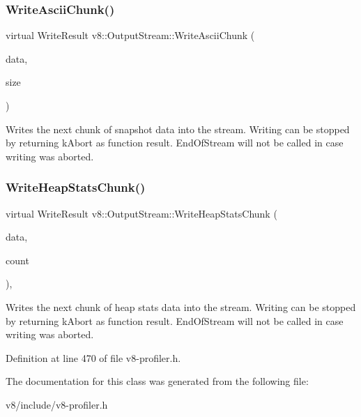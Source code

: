\subsubsection{\texorpdfstring{Write\+Ascii\+Chunk()}{WriteAsciiChunk()}}
{\footnotesize\ttfamily virtual Write\+Result v8\+::\+Output\+Stream\+::\+Write\+Ascii\+Chunk (\begin{DoxyParamCaption}\item[{\mbox{\hyperlink{classchar}{char}} $\ast$}]{data,  }\item[{\mbox{\hyperlink{classint}{int}}}]{size }\end{DoxyParamCaption})\hspace{0.3cm}{\ttfamily [pure virtual]}}

Writes the next chunk of snapshot data into the stream. Writing can be stopped by returning k\+Abort as function result. End\+Of\+Stream will not be called in case writing was aborted. \mbox{\label{classv8_1_1OutputStream_a104fd1a0b5ef685e1d4967aaacbb9e9d}} 
\subsubsection{\texorpdfstring{Write\+Heap\+Stats\+Chunk()}{WriteHeapStatsChunk()}}
{\footnotesize\ttfamily virtual Write\+Result v8\+::\+Output\+Stream\+::\+Write\+Heap\+Stats\+Chunk (\begin{DoxyParamCaption}\item[{\mbox{\hyperlink{structv8_1_1HeapStatsUpdate}{Heap\+Stats\+Update}} $\ast$}]{data,  }\item[{\mbox{\hyperlink{classint}{int}}}]{count }\end{DoxyParamCaption})\hspace{0.3cm}{\ttfamily [inline]}, {\ttfamily [virtual]}}

Writes the next chunk of heap stats data into the stream. Writing can be stopped by returning k\+Abort as function result. End\+Of\+Stream will not be called in case writing was aborted. 

Definition at line 470 of file v8-\/profiler.\+h.



The documentation for this class was generated from the following file\+:\begin{DoxyCompactItemize}
\item 
v8/include/v8-\/profiler.\+h\end{DoxyCompactItemize}

